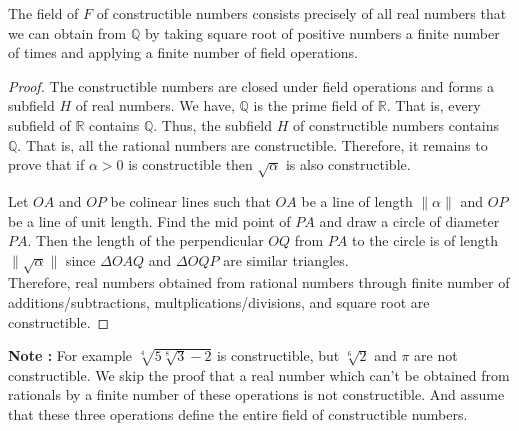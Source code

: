 \begin{theorem}
	The field of $F$ of constructible numbers consists {\color{blue}precisely} of all real numbers that we can obtain from $\mathbb{Q}$ by taking square root of positive numbers a finite number of times and applying a finite number of field operations.
\end{theorem}
\begin{proof}
	The constructible numbers are closed under field operations and forms a subfield $H$ of real numbers.  We have, $\mathbb{Q}$ is the prime field of $\mathbb{R}$. That is, every subfield of $\mathbb{R}$ contains $\mathbb{Q}$. Thus, the subfield $H$ of constructible numbers contains $\mathbb{Q}$. That is, all the rational numbers are constructible. Therefore, it remains to prove that if $\alpha > 0$ is constructible then $\sqrt{\alpha}$ is also constructible.
\begin{center}
\end{center}

	Let $OA$ and $OP$ be colinear lines such that $OA$ be a line of length $\| \alpha \|$ and $OP$ be a line of unit length. Find the mid point of $PA$ and draw a circle of diameter $PA$. Then the length of the perpendicular $OQ$ from $PA$ to the circle is of length $\| \sqrt{\alpha} \|$ since $\Delta OAQ$ and $\Delta OQP$ are similar triangles.\\

	Therefore, real numbers obtained from rational numbers through finite number of additions/subtractions, multplications/divisions, and square root are constructible.
\end{proof}

\textbf{Note : } For example $\sqrt[4]{5\sqrt[8]{3}-2}$ is constructible, but $\sqrt[6]{2}$ and $\pi$ are not constructible. We skip the proof that a real number which can't be obtained from rationals by a finite number of these operations is not constructible. And assume that these three operations define the entire field of constructible numbers.

